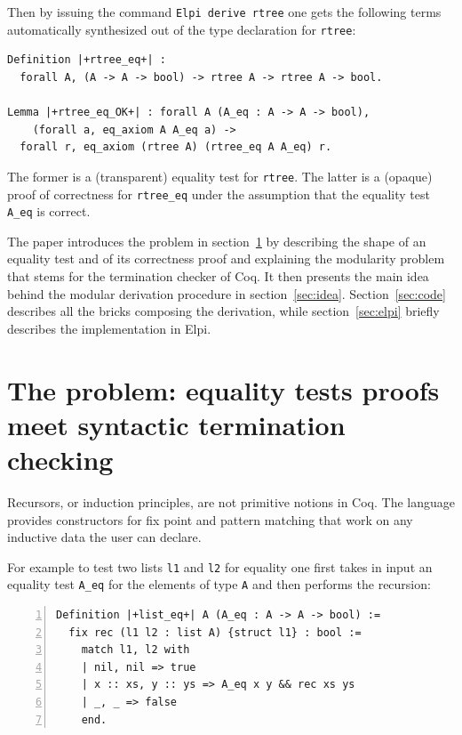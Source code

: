 \documentclass[sigplan,10pt,review]{acmart}\settopmatter{printfolios=true,printccs=false,printacmref=false}
\begin{document}
\noindent
Then by issuing the command \lstinline+Elpi derive rtree+ one gets
the following terms automatically synthesized out of the type
declaration for \lstinline+rtree+:

\begin{minipage}{\textwidth}\begin{lstlisting}
Definition |+rtree_eq+| :
  forall A, (A -> A -> bool) -> rtree A -> rtree A -> bool.

Lemma |+rtree_eq_OK+| : forall A (A_eq : A -> A -> bool),
    (forall a, eq_axiom A A_eq a) ->
  forall r, eq_axiom (rtree A) (rtree_eq A A_eq) r.
\end{lstlisting}\end{minipage}

\noindent
The former is a (transparent) equality test for \lstinline+rtree+.
The latter is a (opaque) proof of correctness for \lstinline+rtree_eq+
under the assumption that the equality test \lstinline+A_eq+ is correct.

The paper introduces the problem in
section~\ref{sec:problem} by describing the shape of an equality test
and of its correctness proof and explaining the modularity problem
that stems for the termination checker of Coq. It then
presents the main idea behind the
modular derivation procedure in section~\ref{sec:idea}.
Section~\ref{sec:code} describes all the bricks composing the
derivation, while section~\ref{sec:elpi} briefly describes the
implementation in Elpi.


\section{The problem: equality tests proofs meet syntactic termination checking} %
\label{sec:problem}

Recursors, or induction principles, are not primitive notions in Coq.
The language provides constructors for fix point and pattern matching
that work on any inductive data the user can declare.

For example to test two lists \lstinline+l1+ and \lstinline+l2+ for
equality one first takes in input an equality test \lstinline+A_eq+
for the elements of type \lstinline+A+ and then performs the
recursion:

\begin{minipage}{\textwidth}\begin{lstlisting}[numbers=left]
Definition |+list_eq+| A (A_eq : A -> A -> bool) :=
  fix rec (l1 l2 : list A) {struct l1} : bool :=
    match l1, l2 with
    | nil, nil => true
    | x :: xs, y :: ys => A_eq x y && rec xs ys
    | _, _ => false
    end.
\end{lstlisting}\end{minipage}
\end{document}
